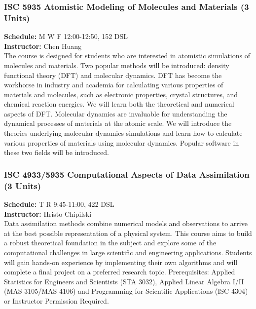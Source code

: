 \documentclass[12pt,a4paper]{article}
\begin{document}
\subsubsection*{ISC 5935 Atomistic Modeling of Molecules and Materials (3 Units)}
\textbf{Schedule:} M W F 12:00-12:50, 152 DSL \\
\textbf{Instructor:} Chen Huang \\
The course is designed for students who are interested in atomistic simulations of molecules and materials. Two popular methods will be introduced: density functional theory (DFT) and molecular dynamics. DFT has become the workhorse in industry and academia for calculating various properties of materials and molecules, such as electronic properties, crystal structures, and chemical reaction energies. We will learn both the theoretical and numerical aspects of DFT. Molecular dynamics are invaluable for understanding the dynamical processes of materials at the atomic scale. We will introduce the theories underlying molecular dynamics simulations and learn how to calculate various properties of materials using molecular dynamics. Popular software in these two fields will be introduced.

\subsubsection*{ISC 4933/5935 Computational Aspects of Data Assimilation (3 Units)}
\textbf{Schedule:} T R 9:45-11:00, 422 DSL \\
\textbf{Instructor:} Hristo Chipilski \\
Data assimilation methods combine numerical models and observations to arrive at the best possible representation of a physical system. This course aims to build a robust theoretical foundation in the subject and explore some of the computational challenges in large scientific and engineering applications. Students will gain hands-on experience by implementing their own algorithms and will complete a final project on a preferred research topic. Prerequisites: Applied Statistics for Engineers and Scientists (STA 3032), Applied Linear Algebra I/II (MAS 3105/MAS 4106) and Programming for Scientific Applications (ISC 4304) or Instructor Permission Required.
\end{document}
